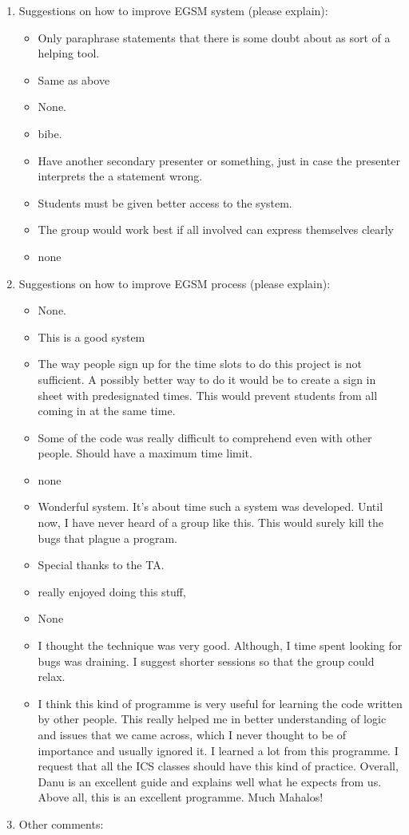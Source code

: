 \begin{enumerate}
\item Suggestions on how to improve EGSM system (please explain):

\begin{itemize}
\item Only paraphrase statements that there is some doubt about as sort of a
helping tool.
\item Same as above
\item None.
\item bibe.
\item Have another secondary presenter or something, just in case the
presenter interprets the a statement wrong.
\item Students must be given better access to the system. 
\item The group would work best if all involved can express themselves clearly
\item none
\end{itemize}


\item Suggestions on how to improve EGSM process (please explain):
\begin{itemize}
\item None.
\item This is a good system
\item The way people sign up for the time slots to do this project is 
not sufficient.  A possibly better way to do it would be to create 
a sign in sheet with predesignated times.  This would prevent students
from all coming in at the same time.
\item Some of the code was really difficult to comprehend even with other
people.  Should have a maximum time limit.
\item none
\item Wonderful system.  It's about time such a system was developed.  Until
now, I have never heard of a group like this.  This would surely kill
the bugs that plague a program.
\item Special thanks to the TA.
\item really enjoyed doing this stuff, 
\item None
\item I thought the technique was very good.  Although, I time spent looking
for bugs was draining.  I suggest shorter sessions so that the group
could relax.
\item 
I think this kind of programme is very useful for learning the code
written by other people.  This really helped me in better
understanding of logic and issues that we came across, which I never
thought to be of importance and usually ignored it.  I learned a lot
from this programme.  I request that all the ICS classes should have
this kind of practice.  Overall, Danu is an excellent guide and
explains well what he expects from us. Above all, this is an excellent
programme.  Much Mahalos!
\end{itemize}


\item Other comments:


\end{enumerate}


